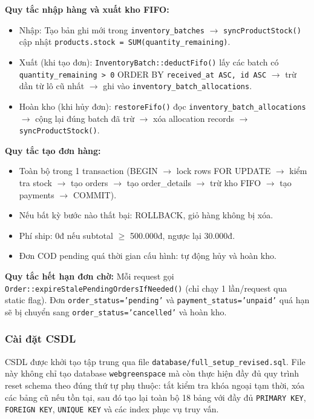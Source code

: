 \documentclass[a4paper]{article}
\begin{document}
\textbf{Quy tắc nhập hàng và xuất kho FIFO:}
\begin{itemize}
    \item Nhập: Tạo bản ghi mới trong \texttt{inventory\_batches} $\to$ \texttt{syncProductStock()} cập nhật \texttt{products.stock = SUM(quantity\_remaining)}.
    \item Xuất (khi tạo đơn): \texttt{InventoryBatch::deductFifo()} lấy các batch có \texttt{quantity\_remaining > 0} ORDER BY \texttt{received\_at ASC, id ASC} $\to$ trừ dần từ lô cũ nhất $\to$ ghi vào \texttt{inventory\_batch\_allocations}.
    \item Hoàn kho (khi hủy đơn): \texttt{restoreFifo()} đọc \texttt{inventory\_batch\_allocations} $\to$ cộng lại đúng batch đã trừ $\to$ xóa allocation records $\to$ \texttt{syncProductStock()}.
\end{itemize}

\textbf{Quy tắc tạo đơn hàng:}
\begin{itemize}
    \item Toàn bộ trong 1 transaction (BEGIN $\to$ lock rows FOR UPDATE $\to$ kiểm tra stock $\to$ tạo orders $\to$ tạo order\_details $\to$ trừ kho FIFO $\to$ tạo payments $\to$ COMMIT).
    \item Nếu bất kỳ bước nào thất bại: ROLLBACK, giỏ hàng không bị xóa.
    \item Phí ship: 0đ nếu subtotal $\geq$ 500.000đ, ngược lại 30.000đ.
    \item Đơn COD pending quá thời gian cấu hình: tự động hủy và hoàn kho.
\end{itemize}

\textbf{Quy tắc hết hạn đơn chờ:}
Mỗi request gọi \texttt{Order::expireStalePendingOrdersIfNeeded()} (chỉ chạy 1 lần/request qua static flag). Đơn \texttt{order\_status='pending'} và \texttt{payment\_status='unpaid'} quá hạn sẽ bị chuyển sang \texttt{order\_status='cancelled'} và hoàn kho.

\subsubsection{Cài đặt CSDL}

CSDL được khởi tạo tập trung qua file \texttt{database/full\_setup\_revised.sql}. File này không chỉ tạo database \texttt{webgreenspace} mà còn thực hiện đầy đủ quy trình reset schema theo đúng thứ tự phụ thuộc: tắt kiểm tra khóa ngoại tạm thời, xóa các bảng cũ nếu tồn tại, sau đó tạo lại toàn bộ 18 bảng với đầy đủ \texttt{PRIMARY KEY}, \texttt{FOREIGN KEY}, \texttt{UNIQUE KEY} và các index phục vụ truy vấn.
\end{document}
